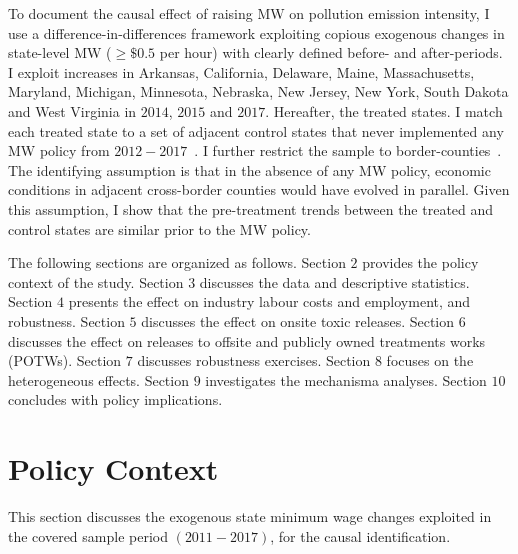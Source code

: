 \documentclass[12pt, english]{article}
\begin{document}
    To document the causal effect of raising MW on pollution emission intensity, I use a difference-in-differences framework exploiting copious exogenous changes in state-level MW ($\geq \$0.5$ per hour) with clearly defined before- and after-periods. I exploit increases in Arkansas, California, Delaware, Maine, Massachusetts, Maryland, Michigan, Minnesota, Nebraska, New Jersey, New York, South Dakota and West Virginia in $2014$, $2015$ and $2017$. Hereafter, the treated states. I match each treated state to a set of adjacent control states that never implemented any MW policy from $2012-2017$~\parencite{gopalan2021state}. I further restrict the sample to border-counties~\parencite{dube2010minimum}. The identifying assumption is that in the absence of any MW policy, economic conditions in adjacent cross-border counties would have evolved in parallel. Given this assumption, I show that the pre-treatment trends between the treated and control states are similar prior to the MW policy.



    The following sections are organized as follows. Section $2$ provides the policy context of the study. Section $3$ discusses the data and descriptive statistics. Section $4$ presents the effect on industry labour costs and employment, and robustness. Section $5$ discusses the effect on onsite toxic releases. Section $6$ discusses the effect on releases to offsite and publicly owned treatments works (POTWs). Section $7$ discusses robustness exercises. Section $8$ focuses on the heterogeneous effects. Section $9$ investigates the mechanisma analyses. Section $10$ concludes with policy implications.


    \section{Policy Context}\label{sec:policy-context}
    This section discusses the exogenous state minimum wage changes exploited in the covered sample period $(2011-2017)$, for the causal identification.
\end{document}
